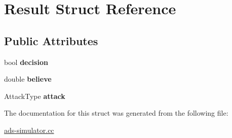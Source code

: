 \hypertarget{structResult}{}\section{Result Struct Reference}
\label{structResult}
\subsection*{Public Attributes}
\begin{DoxyCompactItemize}
\item 
\hypertarget{structResult_a33ea1264dd1da37c4f4b0396febeee09}{}bool {\bfseries decision}\label{structResult_a33ea1264dd1da37c4f4b0396febeee09}

\item 
\hypertarget{structResult_a88d8b02b90ea30990ae18709d0cf389d}{}double {\bfseries believe}\label{structResult_a88d8b02b90ea30990ae18709d0cf389d}

\item 
\hypertarget{structResult_a56c15ef50579a0eb5495a42f6f5c3faa}{}Attack\+Type {\bfseries attack}\label{structResult_a56c15ef50579a0eb5495a42f6f5c3faa}

\end{DoxyCompactItemize}


The documentation for this struct was generated from the following file\+:\begin{DoxyCompactItemize}
\item 
\hyperlink{ads-simulator_8cc}{ads-\/simulator.\+cc}\end{DoxyCompactItemize}
